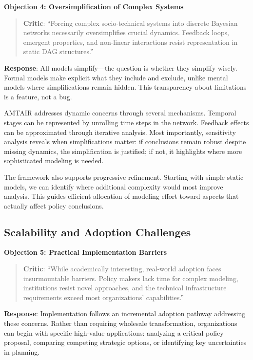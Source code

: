 \documentclass[
  11pt,
  letterpaper,
]{book}
\begin{document}
\textbf{Objection 4: Oversimplification of Complex Systems}

\begin{quote}
\textbf{Critic}: ``Forcing complex socio-technical systems into discrete
Bayesian networks necessarily oversimplifies crucial dynamics. Feedback
loops, emergent properties, and non-linear interactions resist
representation in static DAG structures.''
\end{quote}

\textbf{Response}: All models simplify---the question is whether they
simplify wisely. Formal models make explicit what they include and
exclude, unlike mental models where simplifications remain hidden. This
transparency about limitations is a feature, not a bug.

AMTAIR addresses dynamic concerns through several mechanisms. Temporal
stages can be represented by unrolling time steps in the network.
Feedback effects can be approximated through iterative analysis. Most
importantly, sensitivity analysis reveals when simplifications matter:
if conclusions remain robust despite missing dynamics, the
simplification is justified; if not, it highlights where more
sophisticated modeling is needed.

The framework also supports progressive refinement. Starting with simple
static models, we can identify where additional complexity would most
improve analysis. This guides efficient allocation of modeling effort
toward aspects that actually affect policy conclusions.

\subsection{Scalability and Adoption
Challenges}\label{sec-scalability-adoption}

\textbf{Objection 5: Practical Implementation Barriers}

\begin{quote}
\textbf{Critic}: ``While academically interesting, real-world adoption
faces insurmountable barriers. Policy makers lack time for complex
modeling, institutions resist novel approaches, and the technical
infrastructure requirements exceed most organizations' capabilities.''
\end{quote}

\textbf{Response}: Implementation follows an incremental adoption
pathway addressing these concerns. Rather than requiring wholesale
transformation, organizations can begin with specific high-value
applications: analyzing a critical policy proposal, comparing competing
strategic options, or identifying key uncertainties in planning.
\end{document}
